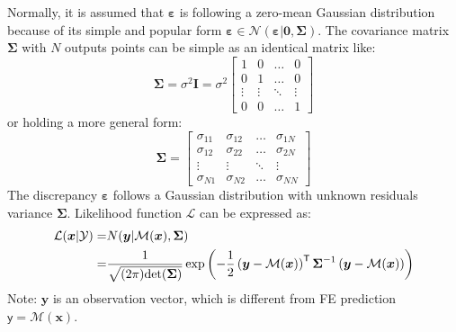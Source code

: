 \documentclass{ol-softwaremanual}
\begin{document}
Normally, it is assumed that $\boldsymbol{\varepsilon}$ is following a zero-mean Gaussian distribution because of its simple and popular form $\boldsymbol{\varepsilon} \in \mathcal{N}(\boldsymbol{\varepsilon}|\boldsymbol{0},\boldsymbol{\Sigma})$. The covariance matrix $\boldsymbol{\Sigma}$ with $N$ outputs points can be simple as an identical matrix like:
\begin{equation}
\label{eq: iid_general_discrepancy}
\boldsymbol{\Sigma} = \sigma^2 \boldsymbol{I}=
\sigma^2
  \begin{bmatrix}
1 & 0 & \hdots & 0 \\
0 & 1 & \hdots & 0 \\
\vdots & \vdots & \ddots & \vdots \\
0 & 0 & \hdots & 1 
\end{bmatrix}   
\end{equation}
or holding a more general form:
\begin{equation}
\label{eq: general_discrepancy}
\boldsymbol{\Sigma} = 
  \begin{bmatrix}
\sigma_{11} & \sigma_{12} & \hdots      & \sigma_{1N} \\
\sigma_{12} & \sigma_{22} & \hdots      & \sigma_{2N} \\
\vdots      & \vdots      & \ddots      & \vdots \\
\sigma_{N1} & \sigma_{N2} & \hdots      & \sigma_{NN}
\end{bmatrix}    
\end{equation}
The discrepancy $\boldsymbol{\varepsilon}$ follows a Gaussian distribution with unknown residuals variance $\boldsymbol{\Sigma}$. Likelihood function $\mathcal{L}$ can be expressed as:
\begin{equation}        
        \label{eq: Likelihood function}
\begin{aligned}
 \mathcal{L}(\boldsymbol{x}|\mathcal{Y}) =& N(\boldsymbol{y}|\mathcal{M}(\boldsymbol{x}),\boldsymbol{\Sigma}) \\
 =&  \frac{1}{\sqrt{(2 \pi){\rm{det}} 
 (\boldsymbol{\Sigma})}}\exp\left(-\frac{1}{2}\left(\boldsymbol{y}  - \mathcal{M}(\boldsymbol{x})\right)^{\mathsf{T}} \boldsymbol{\Sigma}^{-1}\left(\boldsymbol{y}  - \mathcal{M}(\boldsymbol{x})\right)\right)
\end{aligned}
\end{equation}
Note: $\boldsymbol{y}$ is an observation vector, which is different from FE prediction $\boldsymbol{\mathsf{y}} = \mathcal{M}(\boldsymbol{x})$.
\end{document}
